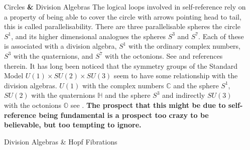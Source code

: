 \documentclass[final]{beamer}
\newlength{\sepwidth}
\newlength{\colwidth}
\newcommand{\separatorcolumn}{\begin{column}{\sepwidth}\end{column}}
\begin{document}
\begin{frame}[t]
\begin{columns}[t]
\separatorcolumn
\begin{column}{\colwidth}

\begin{block}{Circles \textbf \& Division Algebras}
The logical loops involved in self-reference rely on a property of being able to cover the circle with arrows pointing head to tail, this is called parallelisability. There are three parallelisable spheres the circle $S^1$, and its higher dimensional analogues the spheres $S^3$ and $S^7$. Each of these is associated with a division algebra, $S^1$ with the ordinary complex numbers, $S^3$ with the quaternions, and $S^7$ with the octonions. See \autocite{baez_2002} and references therein. It has long been noticed that the symmetry groups of the Standard Model $U(1) \times SU(2) \times SU(3) $ seem to have some relationship with the division algebras. $U(1)$ with the complex numbers $\mathbb{C}$ and the sphere $S^1$, $SU(2)$ with the quaternions $\mathbb{H}$ and the sphere $S^3$ and indirectly $SU(3)$ with the octonions $\mathbb{O}$ see \autocite{Furey2018_fixed, dixon_G_94}. \textbf{The prospect that this might be due to self-reference being fundamental is a prospect too crazy to be believable, but too tempting to ignore.}
\end{block}
\begin{block}{Division Algebras \& Hopf Fibrations}

\end{block}
\end{column}
\end{columns}
\end{frame}
\end{document}
